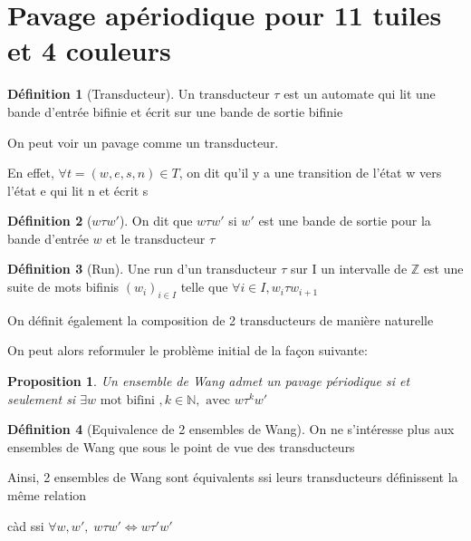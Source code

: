 \documentclass{scrartcl}
\newcommand{\N}{\mathbb N}
\newcommand{\Z}{\mathbb Z}
\newtheorem{proposition}{Proposition}
\theoremstyle{definition}
\newtheorem{definition}{Définition}
\theoremstyle{remark}
\begin{document}
\subsection{}

\section{Pavage apériodique pour 11 tuiles et 4 couleurs}

\begin{definition}[Transducteur]
    
Un transducteur $\tau$ est un automate qui lit une bande d'entrée bifinie et écrit sur une bande de sortie bifinie

\end{definition}

On peut voir un pavage comme un transducteur.

En effet, $\forall t = (w,e,s,n) \in T$, on dit qu'il y a une transition de l'état w vers l'état e qui lit n et écrit s

\begin{definition}[$w \tau w'$]
    
On dit que $w \tau w'$ si $w'$ est une bande de sortie pour la bande d'entrée $w$ et le transducteur $\tau$


\end{definition}

\begin{definition}[Run]
    
Une run d'un transducteur $\tau$ sur I un intervalle de $\Z$ est une suite de mots bifinis ${(w_i)}_{i \in I}$
telle que $\forall i \in I, w_i \tau w_{i+1}$

\end{definition}

On définit également la composition de 2 transducteurs de manière naturelle

On peut alors reformuler le problème initial de la façon suivante:

\begin{proposition}
    
Un ensemble de Wang admet un pavage périodique si et seulement si $\exists w \text{ mot bifini }, k \in \N, \text{ avec } w \tau^k w'$

\end{proposition}

\begin{definition}[Equivalence de 2 ensembles de Wang]
    
On ne s'intéresse plus aux ensembles de Wang que sous le point de vue des transducteurs

Ainsi, 2 ensembles de Wang sont équivalents ssi leurs transducteurs définissent la même relation

càd ssi $\forall w,w', \; w \tau w' \iff w \tau' w'$


\end{definition}
\end{document}
